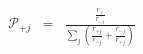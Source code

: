 \begin{eqnarray}
{\mathcal P}_{+j}  & = & \frac{\frac{r_{+}}{r_{-i}}}{\sum_j\left(\frac{r_{+j}}{r_{-j}} + \frac{r_{-j}}{r_{+j}}  \right)} \\
\end{eqnarray}